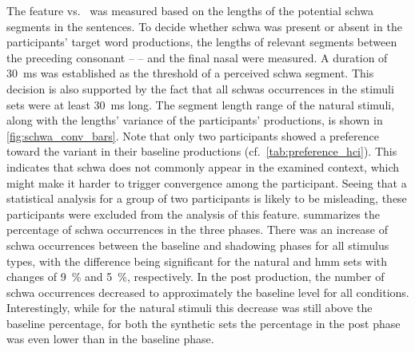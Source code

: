 The feature \textipa{[\s{n}]} vs.\ \textipa{[@n]} was measured based on the lengths of the potential schwa segments in the sentences.
To decide whether schwa was present or absent in the participants' target word productions, the lengths of relevant segments between the preceding consonant --  -- and the final nasal were measured.
A duration of \SI{30}{\milli\second} was established as the threshold of a perceived schwa segment.
This decision is also supported by the fact that all schwas occurrences in the stimuli sets were at least \SI{30}{\milli\second} long.
The segment length range of the natural stimuli, along with the lengths' variance of the participants' productions, is shown in \cref{fig:schwa_conv_bars}.
Note that only two participants showed a preference toward the \textipa{[@n]} variant in their baseline productions (cf.\ \cref{tab:preference_hci}).
This indicates that schwa does not commonly appear in the examined context, which might make it harder to trigger convergence among the participant.
Seeing that a statistical analysis for a group of two participants is likely to be misleading, these participants were excluded from the analysis of this feature.
 summarizes the percentage of schwa occurrences in the three phases.
There was an increase of schwa occurrences between the baseline and shadowing phases for all stimulus types, with the difference being significant for the natural and \ac{hmm} sets with changes of \SI{9}{\percent} and \SI{5}{\percent}, respectively.
In the post production, the number of schwa occurrences decreased to approximately the baseline level for all conditions.
Interestingly, while for the natural stimuli this decrease was still above the baseline percentage, for both the synthetic sets the percentage in the post phase was even lower than in the baseline phase.
%
